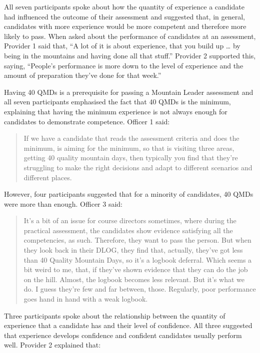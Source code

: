\documentclass[
  12pt,
  a4paper,
]{book}
\begin{document}
All seven participants spoke about how the quantity of experience a candidate had influenced the outcome of their assessment and suggested that, in general, candidates with more experience would be more competent and therefore more likely to pass. When asked about the performance of candidates at an assessment, Provider 1 said that, ``A lot of it is about experience, that you build up \ldots{} by being in the mountains and having done all that stuff.'' Provider 2 supported this, saying, ``People's performance is more down to the level of experience and the amount of preparation they've done for that week.''

Having 40 QMDs is a prerequisite for passing a Mountain Leader assessment and all seven participants emphasised the fact that 40 QMDs is the minimum, explaining that having the minimum experience is not always enough for candidates to demonstrate competence. Officer 1 said:

\begin{quote}
If we have a candidate that reads the assessment criteria and does the minimum, is aiming for the minimum, so that is visiting three areas, getting 40 quality mountain days, then typically you find that they're struggling to make the right decisions and adapt to different scenarios and different places.
\end{quote}

However, four participants suggested that for a minority of candidates, 40 QMDs were more than enough. Officer 3 said:

\begin{quote}
It's a bit of an issue for course directors sometimes, where during the practical assessment, the candidates show evidence satisfying all the competencies, as such. Therefore, they want to pass the person. But when they look back in their DLOG, they find that, actually, they've got less than 40 Quality Mountain Days, so it's a logbook deferral. Which seems a bit weird to me, that, if they've shown evidence that they can do the job on the hill. Almost, the logbook becomes less relevant. But it's what we do. I guess they're few and far between, those. Regularly, poor performance goes hand in hand with a weak logbook.
\end{quote}

Three participants spoke about the relationship between the quantity of experience that a candidate has and their level of confidence. All three suggested that experience develops confidence and confident candidates usually perform well. Provider 2 explained that:
\end{document}
